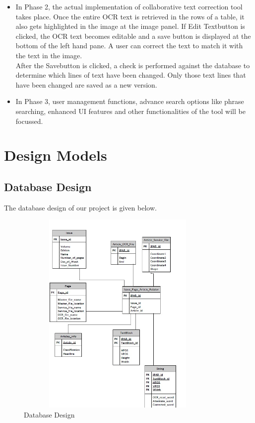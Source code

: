 \documentclass[12pt]{article}
\begin{document}
\begin{itemize}
\item In Phase 2, the actual implementation of collaborative text correction tool takes place. Once the entire OCR text is retrieved in the rows of a table, it also gets highlighted in the image at the image panel. If \textgravedbl Edit Text\textasciidieresis button is clicked, the OCR text becomes editable and a save button is displayed at the bottom of the left hand pane. A user can correct the text to match it with the text in the image. \\
After the \textgravedbl Save\textasciidieresis button is clicked, a check is performed against the database to determine which lines of text have been changed.  Only those text lines that have been changed are saved as a new version.
\item In Phase 3, user management functions, advance search options like phrase searching, enhanced UI features and other functionalities of the tool will be focussed.
\end{itemize}

\section{Design Models}
\label{sec:models}
\subsection{Database Design}

The database design of our project is given below.\\

\begin{figure}[ht!]
\centering
\includegraphics[width=10cm,height=10cm]{diag.jpg}
\caption{Database Design}
\label{fig:2}
\end{figure}
\end{document}
